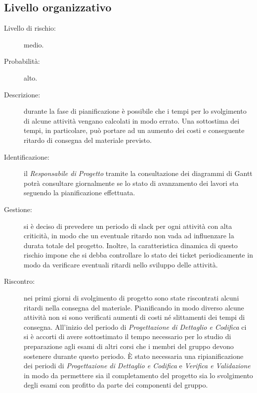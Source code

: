\subsection{Livello organizzativo}
\begin{description}
	\item[Livello di rischio:] medio.
	\item[Probabilità:] alto.
	\item[Descrizione:] durante la fase di pianificazione è possibile che i tempi per lo svolgimento di alcune attività vengano calcolati in modo errato. Una sottostima dei tempi, in particolare, può portare ad un aumento dei costi e conseguente ritardo di consegna del materiale previsto. 
	\item[Identificazione:] il \textit{Responsabile di Progetto} tramite la consultazione dei diagrammi di \gls{Gantt} potrà consultare giornalmente se lo stato di avanzamento dei lavori sta seguendo la pianificazione effettuata.
	\item[Gestione:] si è deciso di prevedere un periodo di \gls{slack} per ogni attività con alta criticità, in modo che un eventuale ritardo non vada ad influenzare la durata totale del progetto. Inoltre, la caratteristica dinamica di questo rischio impone che si debba controllare lo stato dei \gls{ticket} periodicamente in modo da verificare eventuali ritardi nello sviluppo delle attività. 
	\item[Riscontro:] nei primi giorni di svolgimento di progetto sono state riscontrati alcuni ritardi nella consegna del materiale. Pianificando in modo diverso alcune attività non si sono verificati aumenti di costi né slittamenti dei tempi di consegna. All'inizio del periodo di \textit{Progettazione di Dettaglio e Codifica} ci si è accorti di avere sottostimato il tempo necessario per lo studio di preparazione agli esami di altri corsi che i membri del gruppo devono sostenere durante questo periodo. È stato necessaria una ripianificazione dei periodi di \textit{Progettazione di Dettaglio e Codifica} e \textit{Verifica e Validazione} in modo da permettere sia il completamento del progetto sia lo svolgimento degli esami con profitto da parte dei componenti del gruppo. 
\end{description}


